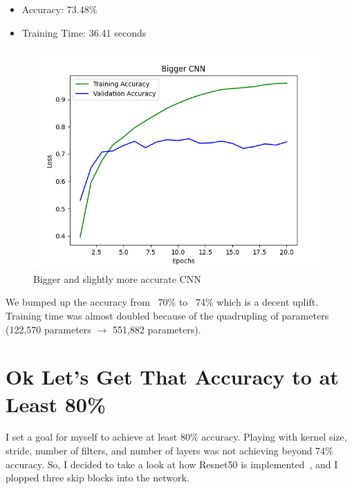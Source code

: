 \documentclass{article}
\begin{document}
    \begin{itemize}
        \item Accuracy: 73.48\%
        \item Training Time: 36.41 seconds
    \end{itemize}

    \begin{figure}[!htbp]
        \centerline{\includegraphics[width=0.55\columnwidth]{Bigger CNN}}
        \caption{Bigger and slightly more accurate CNN}
        \label{fig:bigger}
    \end{figure}

    We bumped up the accuracy from ~70\% to ~74\% which is a decent uplift.
    Training time was almost doubled because of the quadrupling of parameters (122,570 parameters $\rightarrow$ 551,882 parameters).

    \section{Ok Let's Get That Accuracy to at Least 80\%}\label{skip-connections}

    I set a goal for myself to achieve at least 80\% accuracy.
    Playing with kernel size, stride, number of filters, and number of layers was not achieving beyond 74\% accuracy.
    So, I decided to take a look at how Resnet50 is implemented~\cite{mukherjee2022annotated}, and I plopped three skip blocks into the network.
\end{document}
